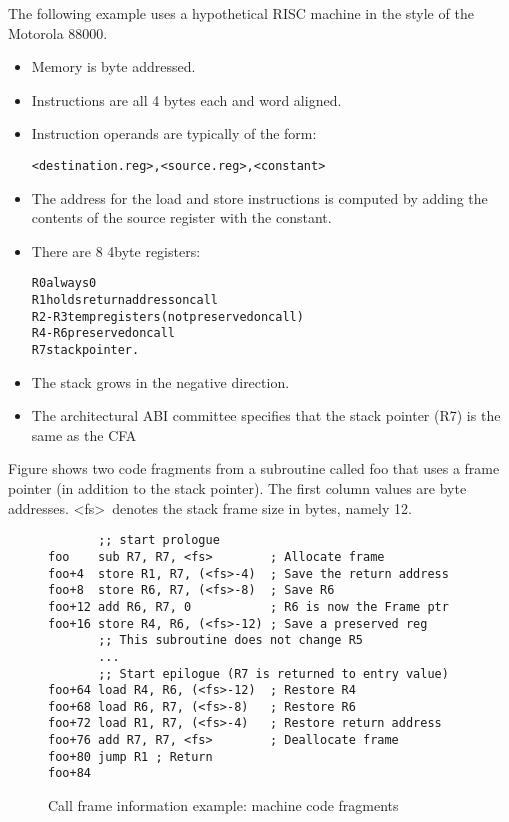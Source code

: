The following example uses a hypothetical RISC machine in
the style of the Motorola 88000.
\begin{itemize}
\item Memory is byte addressed.

\item Instructions are all 4 bytes each and word aligned.

\item Instruction operands are typically of the form:
\begin{alltt}
    <destination.reg>, <source.reg>, <constant>
\end{alltt}

\item The address for the load and store instructions is computed
by adding the contents of the
source register with the constant.

\item There are 8 4\dash byte registers:
\begin{alltt}
    R0 always 0
    R1 holds return address on call
    R2-R3 temp registers (not preserved on call)
    R4-R6 preserved on call
    R7 stack pointer.
\end{alltt}

\item  The stack grows in the negative direction.

\item The architectural ABI committee specifies that the
stack pointer (R7) is the same as the CFA

\end{itemize}

Figure 
shows two code fragments from a subroutine called
foo that uses a frame pointer (in addition to the stack
pointer). The first column values are byte addresses. 
\textless fs\textgreater\ denotes the stack frame size in bytes, namely 12.


\begin{figure}[here]
\begin{lstlisting}
       ;; start prologue
foo    sub R7, R7, <fs>        ; Allocate frame
foo+4  store R1, R7, (<fs>-4)  ; Save the return address
foo+8  store R6, R7, (<fs>-8)  ; Save R6
foo+12 add R6, R7, 0           ; R6 is now the Frame ptr
foo+16 store R4, R6, (<fs>-12) ; Save a preserved reg
       ;; This subroutine does not change R5
       ...
       ;; Start epilogue (R7 is returned to entry value)
foo+64 load R4, R6, (<fs>-12)  ; Restore R4
foo+68 load R6, R7, (<fs>-8)   ; Restore R6
foo+72 load R1, R7, (<fs>-4)   ; Restore return address
foo+76 add R7, R7, <fs>        ; Deallocate frame
foo+80 jump R1 ; Return
foo+84
\end{lstlisting}
\caption{Call frame information example: machine code fragments}
\label{fig:callframeinformationexamplemachinecodefragments}
\end{figure}


